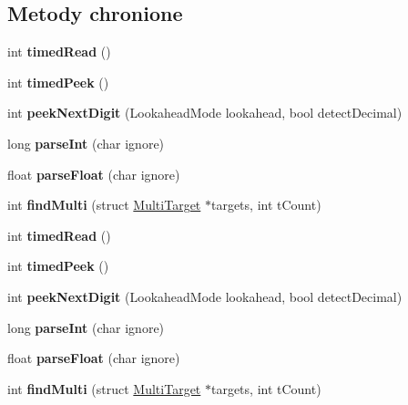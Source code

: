\subsection*{Metody chronione}
\begin{DoxyCompactItemize}
\item 
\mbox{\label{class_stream_a416a0ada5ed3c9d27f1e72c7d73f0aa1}} 
int {\bfseries timed\+Read} ()
\item 
\mbox{\label{class_stream_ae326bf60a3c5276836526710871046fe}} 
int {\bfseries timed\+Peek} ()
\item 
\mbox{\label{class_stream_a3dbc4937689c81b76f4ab16e253e85e0}} 
int {\bfseries peek\+Next\+Digit} (Lookahead\+Mode lookahead, bool detect\+Decimal)
\item 
\mbox{\label{class_stream_ae37760d5dbfe38e9b9ab403d304c51d8}} 
long {\bfseries parse\+Int} (char ignore)
\item 
\mbox{\label{class_stream_a5dcf499b28028a5c76f5f9cfe1b73785}} 
float {\bfseries parse\+Float} (char ignore)
\item 
\mbox{\label{class_stream_a5fb669d95dbf5b7b8a8e900c53d62a1e}} 
int {\bfseries find\+Multi} (struct \hyperlink{struct_stream_1_1_multi_target}{Multi\+Target} $\ast$targets, int t\+Count)
\item 
\mbox{\label{class_stream_a416a0ada5ed3c9d27f1e72c7d73f0aa1}} 
int {\bfseries timed\+Read} ()
\item 
\mbox{\label{class_stream_ae326bf60a3c5276836526710871046fe}} 
int {\bfseries timed\+Peek} ()
\item 
\mbox{\label{class_stream_a3dbc4937689c81b76f4ab16e253e85e0}} 
int {\bfseries peek\+Next\+Digit} (Lookahead\+Mode lookahead, bool detect\+Decimal)
\item 
\mbox{\label{class_stream_ae37760d5dbfe38e9b9ab403d304c51d8}} 
long {\bfseries parse\+Int} (char ignore)
\item 
\mbox{\label{class_stream_a5dcf499b28028a5c76f5f9cfe1b73785}} 
float {\bfseries parse\+Float} (char ignore)
\item 
\mbox{\label{class_stream_a5fb669d95dbf5b7b8a8e900c53d62a1e}} 
int {\bfseries find\+Multi} (struct \hyperlink{struct_stream_1_1_multi_target}{Multi\+Target} $\ast$targets, int t\+Count)
\end{DoxyCompactItemize}
